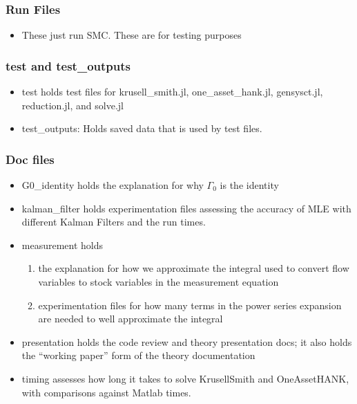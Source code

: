 \documentclass{beamer}
\begin{document}
\begin{frame}
\frametitle{Run Files}
\begin{itemize}
\item These just run SMC. These are for testing purposes
\end{itemize}
\end{frame}

\begin{frame}
  \frametitle{test and test\_outputs}
\begin{itemize}
\item test holds test files for krusell\_smith.jl, one\_asset\_hank.jl, gensysct.jl, reduction.jl, and solve.jl
\item test\_outputs: Holds saved data that is used by test files.
\end{itemize}
\end{frame}

\begin{frame}
  \frametitle{Doc files}
\begin{itemize}
\item G0\_identity holds the explanation for why $\Gamma_0$ is the identity
\item kalman\_filter holds experimentation files assessing the accuracy of MLE with different Kalman Filters and the run times.
\item measurement holds
  \begin{enumerate}
  \item  the explanation for how we approximate the integral used to convert flow variables to stock variables in the measurement equation
  \item experimentation files for how many terms in the power series expansion are needed to well approximate the integral
  \end{enumerate}
\item presentation holds the code review and theory presentation docs; it also holds the ``working paper'' form of the theory documentation
\item  timing assesses how long it takes to solve KrusellSmith and OneAssetHANK, with comparisons against Matlab times.
\end{itemize}
\end{frame}
\end{document}

